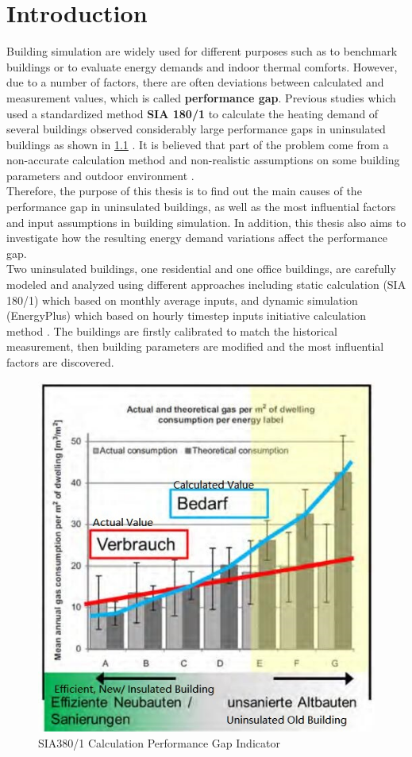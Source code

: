 \chapter{Introduction}\label{sec:introduction}
	
		Building simulation are widely used for different purposes such as to benchmark buildings or to evaluate energy demands and indoor thermal comforts. However, due to a number of factors, there are often deviations between calculated  and measurement values, which is called \textbf{performance gap}. Previous studies which used a standardized method \textbf{SIA 180/1} to calculate the heating demand of several buildings observed considerably large performance gaps in uninsulated buildings as shown in \ref{fig:SIA380PG} \cite{SIAPreviousreport}. It is believed that part of the problem come from a non-accurate calculation method and non-realistic assumptions on some building parameters and outdoor environment \cite{SIAPreviousreport}. \\
	
	
		Therefore, the purpose of this thesis is to find out the main causes of the performance gap in uninsulated buildings, as well as the most influential factors and input assumptions in building simulation. In addition, this thesis also aims to investigate how the resulting energy demand variations affect the performance gap.\\

	
		Two uninsulated buildings, one residential and one office buildings, are carefully modeled and analyzed using different approaches including static calculation (SIA 180/1) which based on monthly average inputs, and dynamic simulation (EnergyPlus) which based on hourly timestep inputs initiative calculation method \cite{SIA2024Shop,SIAPreviousreport,crawley2000energy}. The buildings are firstly calibrated to match the historical measurement, then building parameters are modified and the most influential factors are discovered.\\

			\begin{figure}[h!]
			\centering
			\includegraphics[scale=0.65]{Figure/SIA380Issue.jpg}
			\caption{SIA380/1 Calculation Performance Gap Indicator \cite{SIAPreviousreport}}
			\label{fig:SIA380PG}
			\end{figure}

